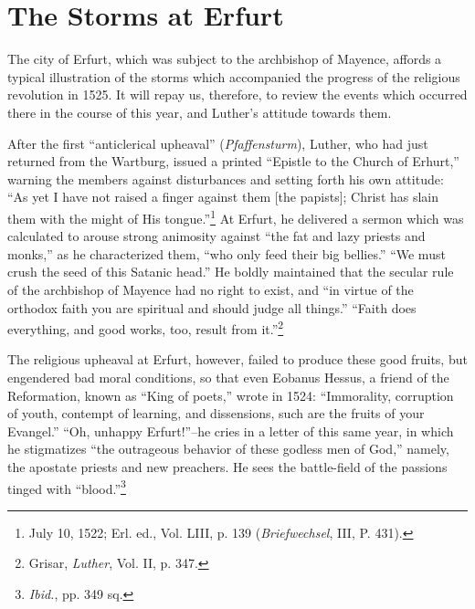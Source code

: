 \section{The Storms at Erfurt}

The city of Erfurt, which was subject to the archbishop of Mayence, affords
a typical illustration of the storms which accompanied
the progress of the religious revolution in 1525. It will repay us, therefore,
to review the events which occurred there in the course of this
year, and Luther’s attitude towards them.

After the first “anticlerical upheaval” (\textit{Pfaffensturm}), Luther,
who had just returned from the Wartburg, issued a printed ``Epistle
to the Church of Erhurt,'' warning the members against disturbances
and setting forth his own attitude: “As yet I have not raised a finger
against them [the papists]; Christ has slain them with the might
of His tongue.”\footnote
{July 10, 1522; Erl. ed., Vol. LIII, p. 139 (\textit{Briefwechsel}, III, P. 431).}
At Erfurt, he delivered a sermon which was
calculated to arouse strong animosity against “the fat and lazy
priests and monks,” as he characterized them, “who only feed their
big bellies.” “We must crush the seed of this Satanic head.” He
boldly maintained that the secular rule of the archbishop of Mayence
had no right to exist, and “in virtue of the orthodox faith you are
spiritual and should judge all things.” “Faith does everything, and
good works, too, result from it.”\footnote{Grisar, \textit{Luther}, Vol. II, p. 347.}

The religious upheaval at Erfurt, however, failed to produce these
good fruits, but engendered bad moral conditions, so that even
Eobanus Hessus, a friend of the Reformation, known as “King
of poets,” wrote in 1524: “Immorality, corruption of youth, contempt of
learning, and dissensions, such are the fruits of your
Evangel.” “Oh, unhappy Erfurt!”--he cries in a letter of this same
year, in which he stigmatizes “the outrageous behavior of these godless
men of God,” namely, the apostate priests and new preachers.
He sees the battle-field of the passions tinged with “blood.”\footnote
{\textit{Ibid.}, pp. 349 sq.}

